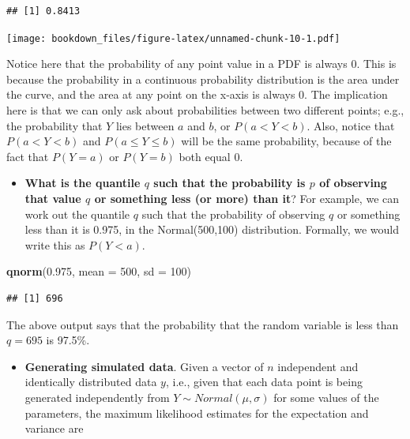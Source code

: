 \documentclass[12pt,]{krantz}
\newenvironment{Shaded}{\begin{snugshade}}{\end{snugshade}}
\newcommand{\DataTypeTok}[1]{\textcolor[rgb]{0.13,0.29,0.53}{#1}}
\newcommand{\DecValTok}[1]{\textcolor[rgb]{0.00,0.00,0.81}{#1}}
\newcommand{\FloatTok}[1]{\textcolor[rgb]{0.00,0.00,0.81}{#1}}
\newcommand{\KeywordTok}[1]{\textcolor[rgb]{0.13,0.29,0.53}{\textbf{#1}}}
\newcommand{\NormalTok}[1]{#1}
\providecommand{\tightlist}{%
  \setlength{\itemsep}{0pt}\setlength{\parskip}{0pt}}
\begin{document}
\begin{verbatim}
## [1] 0.8413
\end{verbatim}

\texttt{[image: bookdown\_files/figure-latex/unnamed-chunk-10-1.pdf]}

Notice here that the probability of any point value in a PDF is always 0. This is because the probability in a continuous probability distribution is the area under the curve, and the area at any point on the x-axis is always 0. The implication here is that we can only ask about probabilities between two different points; e.g., the probability that \(Y\) lies between \(a\) and \(b\), or \(P(a<Y<b)\). Also, notice that \(P(a<Y<b)\) and \(P(a\leq Y\leq b)\) will be the same probability, because of the fact that \(P(Y=a)\) or \(P(Y=b)\) both equal 0.

\begin{itemize}
\tightlist
\item
  \textbf{What is the quantile \(q\) such that the probability is \(p\) of observing that value \(q\) or something less (or more) than it}? For example, we can work out the quantile \(q\) such that the probability of observing \(q\) or something less than it is 0.975, in the Normal(500,100) distribution. Formally, we would write this as \(P(Y<a)\).
\end{itemize}

\begin{Shaded}
\begin{Highlighting}[]
\KeywordTok{qnorm}\NormalTok{(}\FloatTok{0.975}\NormalTok{, }\DataTypeTok{mean =} \DecValTok{500}\NormalTok{, }\DataTypeTok{sd =} \DecValTok{100}\NormalTok{)}
\end{Highlighting}
\end{Shaded}

\begin{verbatim}
## [1] 696
\end{verbatim}

The above output says that the probability that the random variable is less than \(q=695\) is 97.5\%.

\begin{itemize}
\tightlist
\item
  \textbf{Generating simulated data}. Given a vector of \(n\) independent and identically distributed data \(y\), i.e., given that each data point is being generated independently from \(Y \sim Normal(\mu,\sigma)\) for some values of the parameters, the maximum likelihood estimates for the expectation and variance are
\end{itemize}
\end{document}
